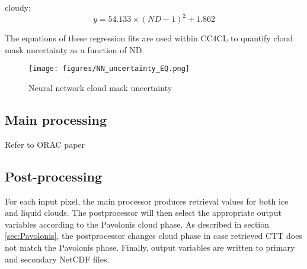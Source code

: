 cloudy:
\begin{equation}
  y = 54.133 \times (ND-1)^2 + 1.862
\end{equation}

The equations of these regression fits are used within CC4CL to quantify cloud mask uncertainty as a function of ND.

\begin{figure}[h]
  \texttt{[image: figures/NN\_uncertainty\_EQ.png]}
  \caption{Neural network cloud mask uncertainty}
  \label{fig:NN_unc}
\end{figure}

\subsection{Main processing}
Refer to ORAC paper
\subsection{Post-processing}
For each input pixel, the main processor produces retrieval values for both ice and liquid clouds. The postprocessor will then select the appropriate output variables according to the Pavolonis cloud phase. As described in section \ref{sec:Pavolonis}, the postprocessor changes cloud phase in case retrieved CTT does not match the Pavolonis phase. Finally, output variables are written to primary and secondary NetCDF files.

